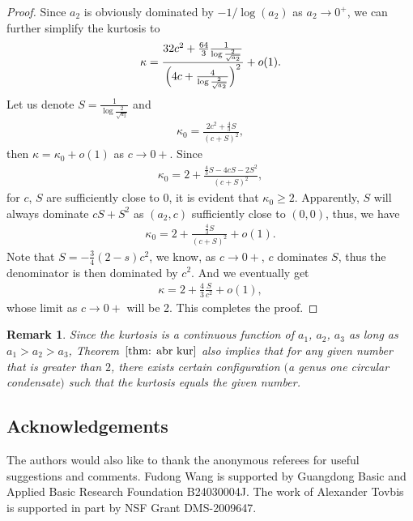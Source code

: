 \documentclass[pdftex]{sigma}
\numberwithin{equation}{section}
\newtheorem{Remark}[Theorem]{Remark}
\def\ra{\rightarrow}
\begin{document}
\begin{proof}
Since $a_2$ is obviously dominated by $-1/\log(a_2)$ as $a_2\ra 0^+$, we can further simplify the kurtosis to
\begin{align*}
\kappa = \frac{32c^2+\frac{64}{3}\frac{1}{\log\frac{2}{\sqrt{a_2}}}}{\Bigl(4c+\frac{4}{\log\frac{2}{\sqrt{a_2}}}\Bigr)^2}+o(1).
\end{align*}
Let us denote $S=\frac{1}{\log\frac{2}{\sqrt{a_2}}}$ and
\begin{align*}
\kappa_{0}=\frac{2c^2+\frac{4}{3}S}{(c+S)^2},
\end{align*}
then $\kappa=\kappa_0+o(1)$ as $c\ra 0+$.
Since
\begin{align*}
\kappa_0=2+\frac{\frac{4}{3}S-4cS-2S^2}{(c+S)^2},
\end{align*}
for $c$, $S$ are sufficiently close to $0$, it is evident that $\kappa_0\geq 2$. Apparently, $S$ will always dominate $cS+S^2$ as $(a_2,c)$ sufficiently close to $(0,0)$, thus, we have
\begin{align*}
\kappa_0=2+\frac{\frac{4}{3}S}{(c+S)^2}+o(1).
\end{align*}
Note that $S=-\frac{3}{4}(2-s)c^2$, we know, as $c\ra 0+$, $c$ dominates $S$, thus the denominator is then dominated by $c^2$. And we eventually get
\begin{align*}
\kappa=2+\frac{4}{3}\frac{S}{c^2}+o(1),
\end{align*}
whose limit as $c\ra 0+$ will be 2. This completes the proof.
\end{proof}

\begin{Remark}
Since the kurtosis is a continuous function of $a_1$, $a_2$, $a_3$ as long as $a_1>a_2>a_3$, Theorem~$\ref{thm: abr kur}$ also implies that for any given number that is greater than $2$, there exists certain configuration $($a genus one circular condensate$)$ such that the kurtosis equals the given number.
\end{Remark}


\subsection*{Acknowledgements}

The authors would also like to thank the anonymous referees for useful suggestions and comments. Fudong Wang is supported by Guangdong Basic and Applied Basic Research Foundation B24030004J. The work of Alexander Tovbis is supported in part by NSF Grant DMS-2009647.
\end{document}
